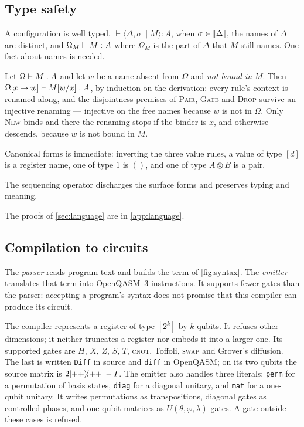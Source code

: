 \documentclass[acmsmall,screen,review,anonymous,nonacm]{acmart}
\begin{document}
\subsection{Type safety}\label{sec:lang:safety}

A configuration is well typed, $\vdash \langle \Delta, \sigma \parallel M\rangle : A$,
when $\sigma \in [\![\Delta]\!]$, the names of $\Delta$ are distinct, and
$\Omega_M \vdash M : A$ where $\Omega_M$ is the part of $\Delta$ that $M$ still names.
One fact about names is needed.

\begin{remark}[renaming]\label{rem:subst}
Let $\Omega \vdash M : A$ and let $w$ be a name absent from $\Omega$ and
\emph{not bound in} $M$.
Then $\Omega[x \mapsto w] \vdash M[w/x] : A$, by induction on the derivation: every
rule's context is renamed along, and the disjointness premises of \textsc{Pair},
\textsc{Gate} and \textsc{Drop} survive an injective renaming --- injective on the
free names because $w$ is not in $\Omega$. Only \textsc{New} binds and there the
renaming stops if the binder is $x$, and otherwise descends, because $w$ is not
bound in $M$.
\end{remark}

\stmtTypeSafety

Canonical forms is immediate: inverting the three value rules,
a value of type $[d]$ is a register name, one of type $1$ is $()$, and one of type
$A \otimes B$ is a pair.

The sequencing operator discharges the surface forms and preserves
typing and meaning.

\stmtDesugar

The proofs of \cref{sec:language} are in \cref{app:language}.

\subsection{Compilation to circuits}\label{sec:lang:compile}

The \emph{parser} reads program text and builds the term of
\cref{fig:syntax}. The \emph{emitter} translates that term into OpenQASM~3
instructions. It supports fewer gates than the parser: accepting a program's
syntax does not promise that this compiler can produce its circuit.

The compiler represents a register of type $[2^k]$ by $k$ qubits.
It refuses other dimensions; it neither truncates a register nor embeds it
into a larger one. Its supported gates are $H$, $X$, $Z$, $S$, $T$,
\textsc{cnot}, Toffoli, \textsc{swap} and Grover's diffusion.
The last is written \texttt{Diff} in source and \texttt{diff} in OpenQASM;
on its two qubits the source matrix is $2\lvert ++ \rangle\!\langle ++ \rvert-I$.
The emitter also handles three literals: \texttt{perm} for a permutation
of basis states, \texttt{diag} for a diagonal unitary, and \texttt{mat}
for a one-qubit unitary. It writes permutations as transpositions,
diagonal gates as controlled phases, and one-qubit matrices as
$U(\theta,\varphi,\lambda)$ gates. A gate outside these cases is refused.
\end{document}
